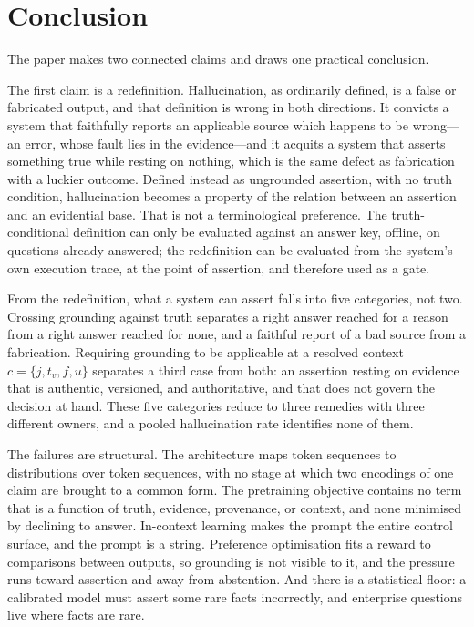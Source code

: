 \section{Conclusion}
\label{sec:conclusion}

The paper makes two connected claims and draws one practical conclusion.

The first claim is a redefinition. Hallucination, as ordinarily defined, is a false
or fabricated output, and that definition is wrong in both directions. It convicts a
system that faithfully reports an applicable source which happens to be
wrong---an error, whose fault lies in the evidence---and it acquits a system that
asserts something true while resting on nothing, which is the same defect as
fabrication with a luckier outcome. Defined instead as ungrounded assertion, with no
truth condition, hallucination becomes a property of the relation between an
assertion and an evidential base. That is not a terminological preference. The
truth-conditional definition can only be evaluated against an answer key, offline,
on questions already answered; the redefinition can be evaluated from the system's
own execution trace, at the point of assertion, and therefore used as a gate.

From the redefinition, what a system can assert falls into five categories, not two. Crossing
grounding against truth separates a right answer reached for a reason from a right
answer reached for none, and a faithful report of a bad source from a fabrication.
Requiring grounding to be applicable at a resolved context $c = \{j, t_v, f, u\}$
separates a third case from both: an assertion resting on evidence that is
authentic, versioned, and authoritative, and that does not govern the decision at
hand. These five categories reduce to three remedies with three different owners,
and a pooled hallucination rate identifies none of them.

The failures are structural. The architecture maps token sequences to
distributions over token sequences, with no stage at which two encodings of one
claim are brought to a common form. The pretraining objective contains no term that
is a function of truth, evidence, provenance, or context, and none minimised by
declining to answer. In-context learning makes the prompt the entire control
surface, and the prompt is a string. Preference optimisation fits a reward to
comparisons between outputs, so grounding is not visible to it, and the pressure
runs toward assertion and away from abstention. And there is a statistical floor: a
calibrated model must assert some rare facts incorrectly, and enterprise questions
live where facts are rare.

